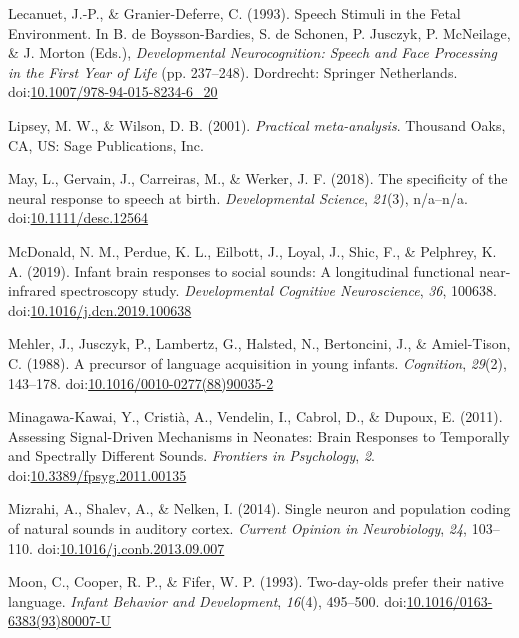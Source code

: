 \documentclass[man]{apa6}
\begin{document}
\hypertarget{ref-lecanuet_speech_1993}{}
Lecanuet, J.-P., \& Granier-Deferre, C. (1993). Speech Stimuli in the
Fetal Environment. In B. de Boysson-Bardies, S. de Schonen, P. Jusczyk,
P. McNeilage, \& J. Morton (Eds.), \emph{Developmental Neurocognition:
Speech and Face Processing in the First Year of Life} (pp. 237--248).
Dordrecht: Springer Netherlands.
doi:\href{https://doi.org/10.1007/978-94-015-8234-6_20}{10.1007/978-94-015-8234-6\_20}

\hypertarget{ref-lipsey_practical_2001}{}
Lipsey, M. W., \& Wilson, D. B. (2001). \emph{Practical meta-analysis}.
Thousand Oaks, CA, US: Sage Publications, Inc.

\hypertarget{ref-may_specificity_2018}{}
May, L., Gervain, J., Carreiras, M., \& Werker, J. F. (2018). The
specificity of the neural response to speech at birth.
\emph{Developmental Science}, \emph{21}(3), n/a--n/a.
doi:\href{https://doi.org/10.1111/desc.12564}{10.1111/desc.12564}

\hypertarget{ref-mcdonald_infant_2019}{}
McDonald, N. M., Perdue, K. L., Eilbott, J., Loyal, J., Shic, F., \&
Pelphrey, K. A. (2019). Infant brain responses to social sounds: A
longitudinal functional near-infrared spectroscopy study.
\emph{Developmental Cognitive Neuroscience}, \emph{36}, 100638.
doi:\href{https://doi.org/10.1016/j.dcn.2019.100638}{10.1016/j.dcn.2019.100638}

\hypertarget{ref-mehler_precursor_1988}{}
Mehler, J., Jusczyk, P., Lambertz, G., Halsted, N., Bertoncini, J., \&
Amiel-Tison, C. (1988). A precursor of language acquisition in young
infants. \emph{Cognition}, \emph{29}(2), 143--178.
doi:\href{https://doi.org/10.1016/0010-0277(88)90035-2}{10.1016/0010-0277(88)90035-2}

\hypertarget{ref-minagawa-kawai_assessing_2011}{}
Minagawa-Kawai, Y., Cristià, A., Vendelin, I., Cabrol, D., \& Dupoux, E.
(2011). Assessing Signal-Driven Mechanisms in Neonates: Brain Responses
to Temporally and Spectrally Different Sounds. \emph{Frontiers in
Psychology}, \emph{2}.
doi:\href{https://doi.org/10.3389/fpsyg.2011.00135}{10.3389/fpsyg.2011.00135}

\hypertarget{ref-mizrahi_single_2014}{}
Mizrahi, A., Shalev, A., \& Nelken, I. (2014). Single neuron and
population coding of natural sounds in auditory cortex. \emph{Current
Opinion in Neurobiology}, \emph{24}, 103--110.
doi:\href{https://doi.org/10.1016/j.conb.2013.09.007}{10.1016/j.conb.2013.09.007}

\hypertarget{ref-moon_two-day-olds_1993}{}
Moon, C., Cooper, R. P., \& Fifer, W. P. (1993). Two-day-olds prefer
their native language. \emph{Infant Behavior and Development},
\emph{16}(4), 495--500.
doi:\href{https://doi.org/10.1016/0163-6383(93)80007-U}{10.1016/0163-6383(93)80007-U}
\end{document}
